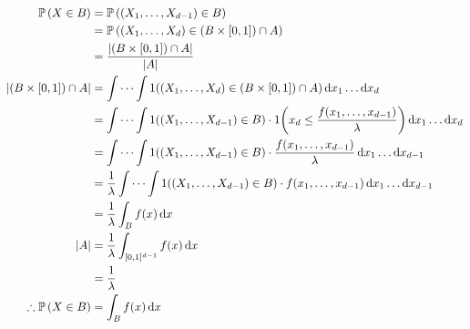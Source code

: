 \begin{align*}
    \mathbb{P}\left({X \in B}\right) &= \mathbb{P}\left({(X_1, \dots, X_{d-1}) \in B}\right) \\
    &= \mathbb{P}\left({(X_1, \dots, X_d) \in (B \times [0, 1]) \cap A}\right) \\
    &= \frac{\abs{(B \times [0, 1]) \cap A}}{\abs{A}} \\
    \abs{(B \times [0, 1]) \cap A} &= \idotsint 1((X_1, \dots, X_d) \in (B \times [0, 1]) \cap A) \dd{x_1} \dots \dd{x_d} \\
    &= \idotsint 1((X_1, \dots, X_{d-1}) \in B)\cdot 1\qty(x_d \leq \frac{f(x_1, \dots, x_{d-1})}{\lambda}) \dd{x_1} \dots \dd{x_d} \\
    &= \idotsint 1((X_1, \dots, X_{d-1}) \in B)\cdot \frac{f(x_1, \dots, x_{d-1})}{\lambda} \dd{x_1} \dots \dd{x_{d-1}} \\
    &= \frac{1}{\lambda} \idotsint 1((X_1, \dots, X_{d-1}) \in B)\cdot f(x_1, \dots, x_{d-1}) \dd{x_1} \dots \dd{x_{d-1}} \\
    &= \frac{1}{\lambda} \int_B f(x) \dd{x} \\
    \abs{A} &= \frac{1}{\lambda} \int_{[0,1]^{d-1}} f(x) \dd{x} \\
    &= \frac{1}{\lambda} \\
    \therefore \mathbb{P}\left({X \in B}\right) &= \int_B f(x) \dd{x}
\end{align*}

